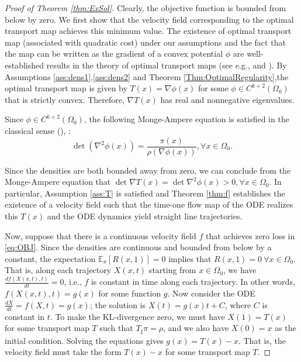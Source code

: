 \begin{proof}[Proof of Theorem \ref{thm:ExSol}]
  Clearly, the objective function is bounded from below by zero. We
  first show that the velocity field corresponding to the
  optimal transport map achieves this minimum value. The existence of optimal transport map (associated with quadratic cost) under our assumptions and the fact that the map can be written as the gradient of a convex potential $\phi$ are well-established results in the theory of optimal transport maps (see e.g., \cite{OptimalOldAndNew} and \cite{BrenierMap}). By Assumptions \ref{ass:dens1},\ref{ass:dens2} and Theorem  \ref{Thm:OptimalRegularity},the optimal transport map is given by $T(x) = \nabla\phi(x)$ for some $\phi\in C^{k+2}(\Omega_0)$ that is strictly convex. Therefore, $\nabla T(x)$ has real and nonnegative eigenvalues. 
  
  Since $\phi\in C^{k+2}(\Omega_0)$, the following Monge-Ampere equation is satisfied in the classical sense (\cite{BrenierMap}), : 
  $$\det(\nabla^2\phi(x)) = \frac{\pi(x)}{\rho(\nabla\phi(x))}, \forall x\in\Omega_0.$$
  
  Since the densities are both bounded away from zero, we can conclude from the Monge-Ampere equation that $\det \nabla T(x) = \det \nabla^2\phi(x) > 0, \forall x\in\Omega_0$. In particular, Assumption \ref{ass:T} is satisfied and Theorem \ref{thm:f} establishes the existence
of a velocity field such that the time-one flow map of the ODE
realizes this $T(x)$ and the ODE dynamics yield straight line trajectories.


Now, suppose that there is a continuous velocity field $f$ that
achieves zero loss in \eqref{eq:OBJ}. Since the densities are continuous and bounded from below by a constant, the expectation $\mathbb{E}_{\pi}[R(x,1)] = 0$
implies that $R(x,1) = 0\  \forall x \in \Omega_0$.  That is, along each
trajectory $X(x,t)$ starting from $x\in\Omega_0$, we have
$\frac{ d f( X(x,t),t )}{d t} = 0$, i.e., $f$ is
constant in time along each trajectory. In other words,
$f(X(x,t),t) = g(x)$ for some function $g$. 
%
Now consider the ODE $\frac{dX}{dt} = f(X,t) = g(x)$; the solution is $X(t) = g(x)t + C$, where $C$ is constant in $t$. To make the KL-divergence zero,
we must have $X(1) = T(x)$ for some transport map $T$ such that
$T_\sharp\pi = \rho$, and we also have $X(0) = x$ as the initial
condition. Solving the equations gives $g(x) = T(x) - x$. That is, the
velocity field must take the form $T(x) - x$ for some transport map
$T$.


\end{proof}	






